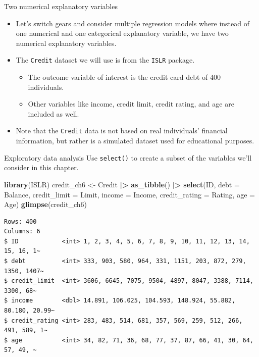 \documentclass[
  ignorenonframetext,
]{beamer}
\newenvironment{Shaded}{\begin{snugshade}}{\end{snugshade}}
\newcommand{\AttributeTok}[1]{\textcolor[rgb]{0.13,0.29,0.53}{#1}}
\newcommand{\FunctionTok}[1]{\textcolor[rgb]{0.13,0.29,0.53}{\textbf{#1}}}
\newcommand{\NormalTok}[1]{#1}
\newcommand{\OtherTok}[1]{\textcolor[rgb]{0.56,0.35,0.01}{#1}}
\newcommand{\SpecialCharTok}[1]{\textcolor[rgb]{0.81,0.36,0.00}{\textbf{#1}}}
\providecommand{\tightlist}{%
  \setlength{\itemsep}{0pt}\setlength{\parskip}{0pt}}
\begin{document}
\begin{frame}[fragile]{Two numerical explanatory variables}
\protect\hypertarget{two-numerical-explanatory-variables-1}{}
\begin{itemize}
\item
  Let's switch gears and consider multiple regression models where
  instead of one numerical and one categorical explanatory variable, we
  have two numerical explanatory variables.
\item
  The \texttt{Credit} dataset we will use is from the \texttt{ISLR}
  package.

  \begin{itemize}
  \tightlist
  \item
    The outcome variable of interest is the credit card debt of 400
    individuals.
  \item
    Other variables like income, credit limit, credit rating, and age
    are included as well.
  \end{itemize}
\item
  Note that the \texttt{Credit} data is not based on real individuals'
  financial information, but rather is a simulated dataset used for
  educational purposes.
\end{itemize}
\end{frame}

\begin{frame}[fragile]{Exploratory data analysis}
\protect\hypertarget{exploratory-data-analysis-14}{}
Use \texttt{select()} to create a subset of the variables we'll consider
in this chapter.

\small

\begin{Shaded}
\begin{Highlighting}[]
\FunctionTok{library}\NormalTok{(ISLR)}
\NormalTok{credit\_ch6 }\OtherTok{\textless{}{-}}\NormalTok{ Credit }\SpecialCharTok{|\textgreater{}} 
  \FunctionTok{as\_tibble}\NormalTok{() }\SpecialCharTok{|\textgreater{}} 
  \FunctionTok{select}\NormalTok{(ID, }\AttributeTok{debt =}\NormalTok{ Balance, }\AttributeTok{credit\_limit =}\NormalTok{ Limit, }
         \AttributeTok{income =}\NormalTok{ Income, }\AttributeTok{credit\_rating =}\NormalTok{ Rating, }\AttributeTok{age =}\NormalTok{ Age)}
\FunctionTok{glimpse}\NormalTok{(credit\_ch6)}
\end{Highlighting}
\end{Shaded}

\begin{verbatim}
Rows: 400
Columns: 6
$ ID            <int> 1, 2, 3, 4, 5, 6, 7, 8, 9, 10, 11, 12, 13, 14, 15, 16, 1~
$ debt          <int> 333, 903, 580, 964, 331, 1151, 203, 872, 279, 1350, 1407~
$ credit_limit  <int> 3606, 6645, 7075, 9504, 4897, 8047, 3388, 7114, 3300, 68~
$ income        <dbl> 14.891, 106.025, 104.593, 148.924, 55.882, 80.180, 20.99~
$ credit_rating <int> 283, 483, 514, 681, 357, 569, 259, 512, 266, 491, 589, 1~
$ age           <int> 34, 82, 71, 36, 68, 77, 37, 87, 66, 41, 30, 64, 57, 49, ~
\end{verbatim}

\normalsize
\end{frame}
\end{document}
